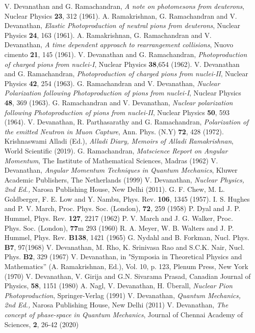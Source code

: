 \begin{thebibliography}{99}
 V. Devanathan and G. Ramachandran, \textit{A note on photomesons from deuterons}, Nuclear Physics \textbf{23}, 312 (1961).
 A. Ramakrishnan, G. Ramachandran and V. Devanathan, \textit{Elastic Photoproduction of neutral pions from deuterons}, Nuclear Physics \textbf{24}, 163 (1961).
 A. Ramakrishnan, G. Ramachandran and V. Devanathan, \textit{A time dependent approach to rearrangement collisions}, Nuovo cimento \textbf{21}, 145 (1961).
 V. Devanathan and G. Ramachandran, \textit{Photoproduction of charged pions from nuclei-I}, Nuclear Physics \textbf{38},654 (1962).
 V. Devanathan and G. Ramachandran, \textit{Photoproduction of charged pions from nuclei-II}, Nuclear Physics \textbf{42}, 254 (1963).
 G. Ramachandran and V. Devanathan, \textit{Nuclear Polarization following Photoproduction of pions from nuclei-I}, Nuclear Physics \textbf{48}, 369 (1963).
 G. Ramachandran and V. Devanathan, \textit{Nuclear polarization following Photoproduction of pions from nuclei-II}, Nuclear Physics \textbf{50}, 593 (1964).
 V. Devanathan, R. Parthasarathy and G. Ramachandran, \textit{Polarization of the emitted Neutron in Muon Capture}, Ann. Phys. (N.Y) \textbf{72}, 428 (1972).
 Krishnaswami Alladi (Ed.), \textit{Alladi Diary, Memoirs of Alladi Ramakrishnan}, World Scientific (2019).
 G. Ramachandran, \textit{Matscience Report on Angular Momentum}, The Institute of Mathematical Sciences, Madras (1962)
 V. Devanathan, \textit{Angular Momentum Techniques in Quantum Mechanics}, Kluwer Academic Publishers, The Netherlands (1999)
 V. Devanathan, \textit{Nuclear Physics, 2nd Ed.,} Narosa Publishing House, New Delhi (2011).
 G. F. Chew, M. L. Goldberger, F. E. Low and Y. Nambu, Phys. Rev. \textbf{106}, 1345 (1957).
 I. S. Hughes and P. V. March, Proc. Phys. Soc. (London), \textbf{72}, 259 (1958)
 P. Dyal and J. P. Hummel, Phys. Rev. \textbf{127}, 2217 (1962)
 P. V. March and J. G. Walker, Proc. Phys. Soc. (London), \textbf{77}m 293 (1960)
 R. A. Meyer, W. B. Walters and J. P. Hummel, Phys. Rev. \textbf{B138}, 1421 (1965)
 G. Nydahl and B. Forkman, Nucl. Phys. \textbf{B7}, 97(1968)
 V. Devanathan, M. Rho, K. Srinivasa Rao and S.C.K. Nair, Nucl. Phys. \textbf{B2}, 329 (1967)
 V. Devanathan, in "Symposia in Theoretical Physics and Mathematics” (A. Ramakrishnan, Ed.), Vol. 10, p. 123, Plenum Press, New York (1970)
 V. Devanathan, V. Girija and G.N. Sivarama Prasad, Canadian Journal of Physics, \textbf{58}, 1151 (1980)
 A. Nagl, V. Devanathan, H. Überall, \textit{Nuclear Pion Photoproduction}, Springer-Verlag (1991)
 V. Devanathan, \textit{Quantum Mechanics, 2nd Ed.,} Narosa Publishing House, New Delhi (2011)
 V. Devanathan, \textit{The concept of phase-space in Quantum Mechanics}, Journal of Chennai Academy of Sciences, \textbf{2}, 26-42 (2020)
\end{thebibliography}



